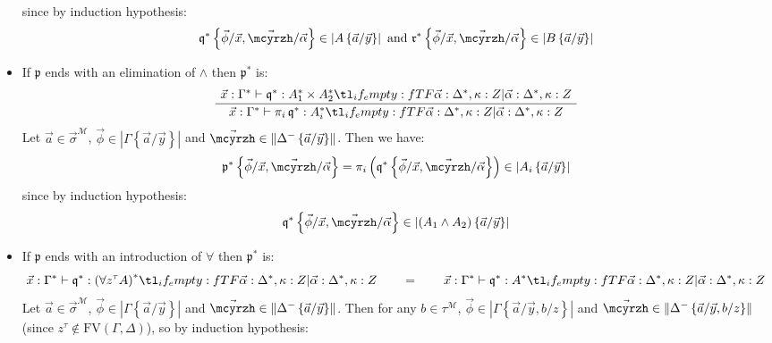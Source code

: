 \documentclass{CSML}
\newcommand*\ifpresent[3]{\tl_if_empty:fTF{#1}{#3}{#2}}
\newcommand*\AXM[1]{\AxiomC{$#1$}}
\newcommand*\UIM[1]{\UnaryInfC{$#1$}}
\newcommand*\DP\DisplayProof
\newcommand*\Entails{\mathrel{\vdash}}
\newcommand*\BarSep{\mathrel{|}}
\newcommand*\Sequent[3]{#1\Entails#2\ifpresent{#3}{\BarSep}{}#3}
\newcommand*\FV[1]{\text{FV}\left(#1\right)}
\newcommand*\SortA{\sigma}
\newcommand*\SortB{\tau}
\newcommand*\LogSortedTerm[2]{#1^{#2}}
\newcommand*\LogVarB{y}
\newcommand*\LogVarC{z}
\newcommand*\LogNeg[1]{{#1^-}}
\newcommand*\LogAnd{\mathbin{\wedge}}
\newcommand*\LogFormA{A}
\newcommand*\LogFormB{B}
\newcommand*\LogProofA{\mathfrak{p}}
\newcommand*\LogProofB{\mathfrak{q}}
\newcommand*\LogProofC{\mathfrak{r}}
\newcommand*\LogSubst[1]{\left\{#1\right\}}
\newcommand*\ModM{\mathcal{M}}
\newcommand*\ModElemA{a}
\newcommand*\ModElemB{b}
\newcommand*\ModMInterp[1]{{#1}^\ModM}
\newcommand*\LmSortExtract{Z}
\newcommand*\LmSortTimes\times
\newcommand*\LmTerm[2]{#1\mathrel{:}#2}
\newcommand*\LmVarA{x}
\newcommand*\LmMVarA\alpha
\newcommand*\LmProj{\pi}
\newcommand*\LmRuleAndElimFirst[4]{\Sequent{#1}{\LmTerm{#3}{#4_1\LmSortTimes#4_2}}{#2}}
\newcommand*\LmRuleAndElimConcl[4]{\Sequent{#1}{\LmTerm{\LmProj_i\,#3}{#4_i}}{#2}}
\newcommand*\LmRuleAndElim[4]{\AXM{\LmRuleAndElimFirst{#1}{#2}{#3}{#4}}\UIM{\LmRuleAndElimConcl{#1}{#2}{#3}{#4}}\DP}
\newcommand*\LmInterpForm[1]{{#1}^*}
\newcommand*\LmInterpProof[1]{{#1}^*}
\newcommand*\CatRCHomA\phi
\newcommand*\CatCHomA\mcyrzh
\newcommand*\RealValNeg[1]{\left\|#1\right\|}
\newcommand*\RealVal[1]{\left|#1\right|}
\begin{document}
\begin{itemize}
since by induction hypothesis:
$$\LmInterpProof{\LogProofB}\LogSubst{\vec{\CatRCHomA}/\vec{\LmVarA},\vec{\CatCHomA}/\vec{\LmMVarA}}\in\RealVal{\LogFormA\LogSubst{\vec{\ModElemA}/\vec{\LogVarB}}}\text{ and }\LmInterpProof{\LogProofC}\LogSubst{\vec{\CatRCHomA}/\vec{\LmVarA},\vec{\CatCHomA}/\vec{\LmMVarA}}\in\RealVal{\LogFormB\LogSubst{\vec{\ModElemA}/\vec{\LogVarB}}}$$
\item If $\LogProofA$ ends with an elimination of $\LogAnd$ then $\LmInterpProof{\LogProofA}$ is:
$$\LmRuleAndElim{\LmTerm{\vec{\LmVarA}}{\LmInterpForm{\Gamma}}}{\LmTerm{\vec{\LmMVarA}}{\LmInterpForm{\Delta}},\LmTerm{\kappa}{\LmSortExtract}}{\LmInterpProof{\LogProofB}}{\LmInterpForm{\LogFormA}}$$
Let $\vec{\ModElemA}\in\ModMInterp{\vec{\SortA}}$, $\vec{\CatRCHomA}\in\RealVal{\Gamma\LogSubst{\vec{\ModElemA}/\vec{\LogVarB}}}$ and $\vec{\CatCHomA}\in\RealValNeg{\LogNeg{\Delta}\LogSubst{\vec{\ModElemA}/\vec{\LogVarB}}}$. Then we have:
$$\LmInterpProof{\LogProofA}\LogSubst{\vec{\CatRCHomA}/\vec{\LmVarA},\vec{\CatCHomA}/\vec{\LmMVarA}}=\LmProj_i\left(\LmInterpProof{\LogProofB}\LogSubst{\vec{\CatRCHomA}/\vec{\LmVarA},\vec{\CatCHomA}/\vec{\LmMVarA}}\right)\in\RealVal{\LogFormA_i\LogSubst{\vec{\ModElemA}/\vec{\LogVarB}}}$$
since by induction hypothesis:
$$\LmInterpProof{\LogProofB}\LogSubst{\vec{\CatRCHomA}/\vec{\LmVarA},\vec{\CatCHomA}/\vec{\LmMVarA}}\in\RealVal{\left(\LogFormA_1\LogAnd\LogFormA_2\right)\LogSubst{\vec{\ModElemA}/\vec{\LogVarB}}}$$
\item If $\LogProofA$ ends with an introduction of $\forall$ then $\LmInterpProof{\LogProofA}$ is:
$$\Sequent{\LmTerm{\vec{\LmVarA}}{\LmInterpForm{\Gamma}}}{\LmTerm{\LmInterpProof{\LogProofB}}{\LmInterpForm{\left(\forall\LogSortedTerm{\LogVarC}{\SortB}\LogFormA\right)}}}{\LmTerm{\vec{\LmMVarA}}{\LmInterpForm{\Delta}},\LmTerm{\kappa}{\LmSortExtract}}\qquad=\qquad\Sequent{\LmTerm{\vec{\LmVarA}}{\LmInterpForm{\Gamma}}}{\LmTerm{\LmInterpProof{\LogProofB}}{\LmInterpForm{\LogFormA}}}{\LmTerm{\vec{\LmMVarA}}{\LmInterpForm{\Delta}},\LmTerm{\kappa}{\LmSortExtract}}$$
Let $\vec{\ModElemA}\in\ModMInterp{\vec{\SortA}}$, $\vec{\CatRCHomA}\in\RealVal{\Gamma\LogSubst{\vec{\ModElemA}/\vec{\LogVarB}}}$ and $\vec{\CatCHomA}\in\RealValNeg{\LogNeg{\Delta}\LogSubst{\vec{\ModElemA}/\vec{\LogVarB}}}$. Then for any $\ModElemB\in\ModMInterp{\SortB}$, $\vec{\CatRCHomA}\in\RealVal{\Gamma\LogSubst{\vec{\ModElemA}/\vec{\LogVarB},\ModElemB/\LogVarC}}$ and $\vec{\CatCHomA}\in\RealValNeg{\LogNeg{\Delta}\LogSubst{\vec{\ModElemA}/\vec{\LogVarB},\ModElemB/\LogVarC}}$ (since $\LogSortedTerm{\LogVarC}{\SortB}\notin\FV{\Gamma,\Delta}$), so by induction hypothesis:

\end{itemize}
\end{document}
